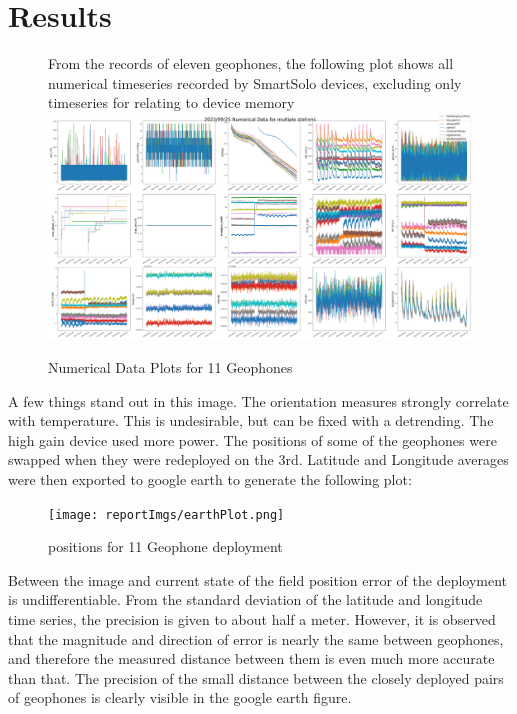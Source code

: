 \section{Results}


\begin{figure}[ht]
    From the records of eleven geophones, the following plot shows all numerical timeseries recorded by SmartSolo devices, 
    excluding only timeseries for relating to device memory
    \centering
    \includegraphics[width=\textwidth]{reportImgs/12geoPhones.png}
    \caption{Numerical Data Plots for 11 Geophones}    
\end{figure}

A few things stand out in this image. The orientation measures strongly correlate with temperature. This is undesirable, but can be fixed with a detrending. 
The high gain device used more power. The positions of some of the geophones were swapped when they were redeployed on the 3rd. 
Latitude and Longitude averages were then exported to google earth to generate the following plot:
\begin{figure}[h]    
    \centering
    \texttt{[image: reportImgs/earthPlot.png]}
    \caption{positions for 11 Geophone deployment}    
\end{figure}

Between the image and current state of the field position error of the deployment is undifferentiable. From the standard deviation of the latitude and longitude time series, the precision is given to about half a meter. 
However, it is observed that the magnitude and direction of error is nearly the same between geophones, and therefore the measured distance between them is even much more accurate than that. The precision 
of the small distance between the closely deployed pairs of geophones is clearly visible in the google earth figure. 




